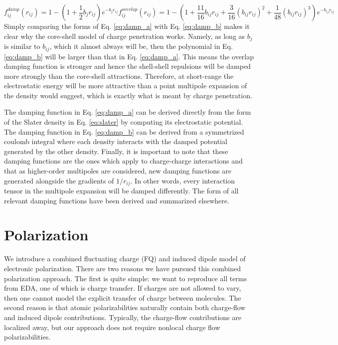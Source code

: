\documentclass[journal=jacsat,manuscript=article]{achemso}
\begin{document}
\begin{subequations}
  \begin{equation}
    f_{ij}^{damp}(r_{ij})=1-\left(1+\frac12b_{j}r_{ij}\right)e^{-b_{j}r_{ij}}
    \label{eq:damp_a}
  \end{equation}
  \begin{equation}
    f_{ij}^{overlap}(r_{ij})=1-\left(1+\frac{11}{16}b_{ij}r_{ij}+\frac{3}{16}(b_{ij}r_{ij})^2+\frac{1}{48}(b_{ij}r_{ij})^3\right)e^{-b_{ij}r_{ij}} 
    \label{eq:damp_b}
  \end{equation}
\end{subequations}
\noindent
Simply comparing the forms of Eq. \ref{eq:damp_a} with Eq. \ref{eq:damp_b} makes it clear why the core-shell model of charge penetration works. Namely, as long as $b_j$ is similar to $b_{ij}$, which it almost always will be, then the polynomial in Eq. \ref{eq:damp_b} will be larger than that in Eq. \ref{eq:damp_a}. This means the overlap damping function is stronger and hence the shell-shell repulsions will be damped more strongly than the core-shell attractions. Therefore, at short-range the electrostatic energy will be more attractive than a point multipole expansion of the density would suggest, which is exactly what is meant by charge penetration.

The damping function in Eq. \ref{eq:damp_a} can be derived directly from the form of the Slater density in Eq. \ref{eq:slater} by computing its electrostatic potential. The damping function in Eq. \ref{eq:damp_b} can be derived from a symmetrized coulomb integral where each density interacts with the damped potential generated by the other density.\cite{rackers2021polarizable} Finally, it is important to note that these damping functions are the ones which apply to charge-charge interactions and that as higher-order multipoles are considered, new damping functions are generated alongside the gradients of $1/r_{ij}$. In other words, every interaction tensor in the multipole expansion will be damped differently. The form of all relevant damping functions have been derived and summarized elsewhere.\cite{rackers2021polarizable}

\section*{Polarization}

We introduce a combined fluctuating charge (FQ) and induced dipole model of electronic polarization. There are two reasons we have pursued this combined polarization approach. The first is quite simple: we want to reproduce all terms from EDA, one of which is charge transfer. If charges are not allowed to vary, then one cannot model the explicit transfer of charge between molecules. The second reason is that atomic polarizabilities naturally contain both charge-flow and induced dipole contributions.\cite{stone1985distributedb} Typically, the charge-flow contributions are localized away\cite{ruth1994localization}, but our approach does not require nonlocal charge flow polarizabilities.
\end{document}
